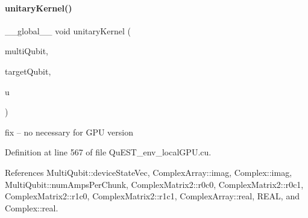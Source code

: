 \paragraph{\texorpdfstring{unitary\+Kernel()}{unitaryKernel()}}
{\footnotesize\ttfamily \+\_\+\+\_\+global\+\_\+\+\_\+ void unitary\+Kernel (\begin{DoxyParamCaption}\item[{\mbox{\hyperlink{structMultiQubit}{Multi\+Qubit}}}]{multi\+Qubit,  }\item[{const int}]{target\+Qubit,  }\item[{\mbox{\hyperlink{structComplexMatrix2}{Complex\+Matrix2}}}]{u }\end{DoxyParamCaption})}

fix -- no necessary for G\+PU version 

Definition at line 567 of file Qu\+E\+S\+T\+\_\+env\+\_\+local\+G\+P\+U.\+cu.



References Multi\+Qubit\+::device\+State\+Vec, Complex\+Array\+::imag, Complex\+::imag, Multi\+Qubit\+::num\+Amps\+Per\+Chunk, Complex\+Matrix2\+::r0c0, Complex\+Matrix2\+::r0c1, Complex\+Matrix2\+::r1c0, Complex\+Matrix2\+::r1c1, Complex\+Array\+::real, R\+E\+AL, and Complex\+::real.


